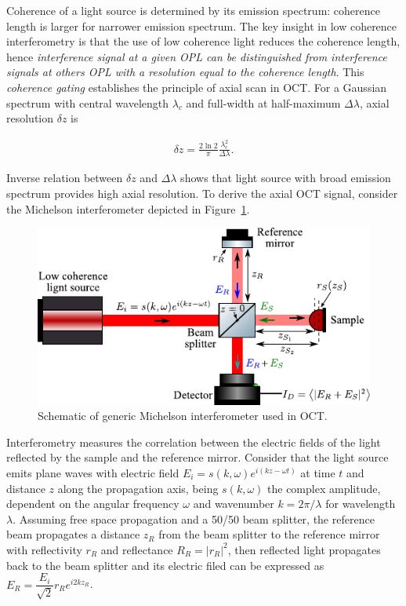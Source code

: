 Coherence of a light source is determined by its emission spectrum: coherence length is larger for narrower emission spectrum. The key insight in low coherence interferometry is that the use of low coherence light reduces the coherence length, hence \textit{interference signal at a given OPL can be distinguished from interference signals at others OPL with a resolution equal to the coherence length}. This \textit{coherence gating} establishes the principle of axial scan in OCT. For a Gaussian spectrum with central wavelength $\lambda_c$ and full-width at half-maximum $\Delta\lambda$, axial resolution $\delta z$ is

\begin{align}\label{eq:axialRes}
    \delta z = \frac{2\ln 2}{\pi}\frac{\lambda_c^2}{\Delta\lambda}.
\end{align}

Inverse relation between $\delta z$ and $\Delta\lambda$ shows that light source with broad emission spectrum provides high axial resolution. To derive the axial OCT signal, consider the Michelson interferometer depicted in Figure~\ref{fig:OCT_Model}.

\begin{figure}[htb!]
    \centering
    \includegraphics[width=.65\textwidth]{Figures/TheoreticalBasis/OCT_Model.pdf}
    \caption{Schematic of generic Michelson interferometer used in OCT.}
    \label{fig:OCT_Model}
\end{figure}

Interferometry measures the correlation between the electric fields of the light reflected by the sample and the reference mirror. Consider that the light source emits plane waves with electric field $E_i = s(k,\omega)e^{i(kz-\omega t)}$ at time $t$ and distance $z$ along the propagation axis, being $s(k,\omega)$ the complex amplitude, dependent on the angular frequency $\omega$ and wavenumber $k=2\pi / \lambda$ for wavelength $\lambda$. Assuming free space propagation and a 50/50 beam splitter, the reference beam propagates a distance $z_R$ from the beam splitter to the reference mirror with reflectivity $r_R$ and reflectance $R_R=|r_R|^2$, then reflected light propagates back to the beam splitter and its electric filed can be expressed as $E_R = \dfrac{E_i}{\sqrt{2}} r_R e^{i2kz_R}$.

